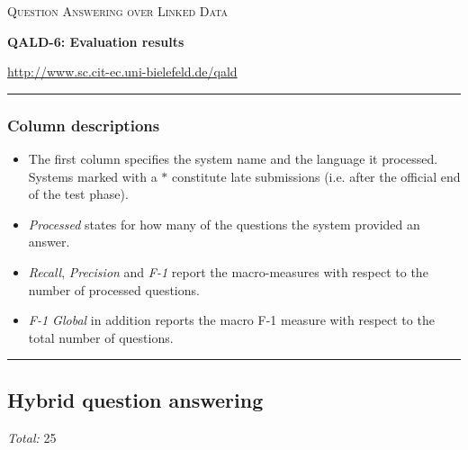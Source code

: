\documentclass{article}
\begin{document}
\thispagestyle{empty}

\begin{center}
\textsc{\large Question Answering over Linked Data}

\vspace{.2cm}

\textbf{\huge QALD-6: Evaluation results}

\vspace{.4cm}

\url{http://www.sc.cit-ec.uni-bielefeld.de/qald}

\end{center}

\hrule

\subsubsection*{Column descriptions}

\begin{itemize}
\item The first column specifies the system name and the language it processed. Systems marked with a $\ast$ constitute late submissions (i.e. after the official end of the test phase).
\item \emph{Processed} states for how many of the questions the system provided an answer.
\item \emph{Recall}, \emph{Precision} and \emph{F-1} report the macro-measures with respect to the number of processed questions.
\item \emph{F-1 Global} in addition reports the macro F-1 measure with respect to the total number of questions.
\end{itemize}

\hrule

\vspace{.4cm}

\subsection*{Hybrid question answering}

\emph{Total:} 25

\vspace{.6cm}
\end{document}
